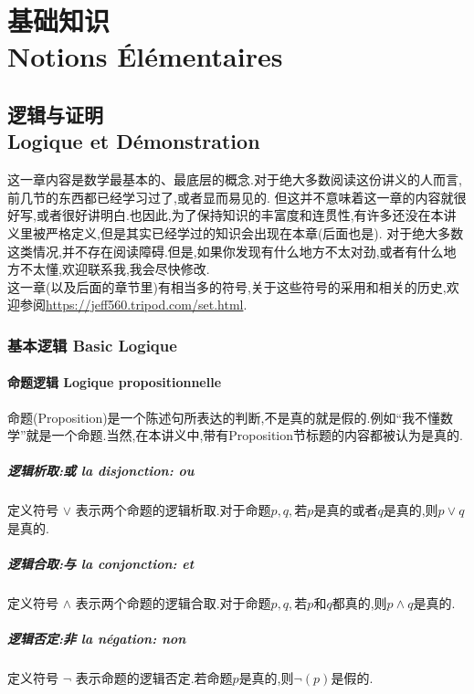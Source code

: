 \documentclass[12pt, a4paper, oneside]{ctexbook}
\begin{document}
\part{基础知识\\ Notions Élémentaires}
\chapter{逻辑与证明\\ Logique et Démonstration}
  这一章内容是数学最基本的、最底层的概念.对于绝大多数阅读这份讲义的人而言,前几节的东西都已经学习过了,或者显而易见的.
  但这并不意味着这一章的内容就很好写,或者很好讲明白.也因此,为了保持知识的丰富度和连贯性,有许多还没在本讲义里被严格定义,但是其实已经学过的知识会出现在本章(后面也是).
  对于绝大多数这类情况,并不存在阅读障碍.但是,如果你发现有什么地方不太对劲,或者有什么地方不太懂,欢迎联系我,我会尽快修改.\\


  这一章(以及后面的章节里)有相当多的符号,关于这些符号的采用和相关的历史,欢迎参阅\url{https://jeff560.tripod.com/set.html}.
  \section{基本逻辑 Basic Logique}
  
  \subsection{命题逻辑 Logique propositionnelle}
  命题(Proposition)是一个陈述句所表达的判断,不是真的就是假的.例如“我不懂数学”就是一个命题.当然,在本讲义中,带有Proposition节标题的内容都被认为是真的.
  \subsubsection{逻辑析取:或  la disjonction: ou}
  定义符号 $\lor $ 表示两个命题的逻辑析取.对于命题$p,q,\text{若}p$是真的或者$q$是真的,则$p\lor q$是真的.
  \subsubsection{逻辑合取:与  la conjonction: et }
  定义符号 $\land  $ 表示两个命题的逻辑合取.对于命题$p,q,\text{若}p$和$q$都真的,则$p\land q$是真的.
  \subsubsection{逻辑否定:非  la négation: non}
  定义符号 $\lnot $ 表示命题的逻辑否定.若命题$p$是真的,则$\lnot(p)$是假的.
\end{document}
